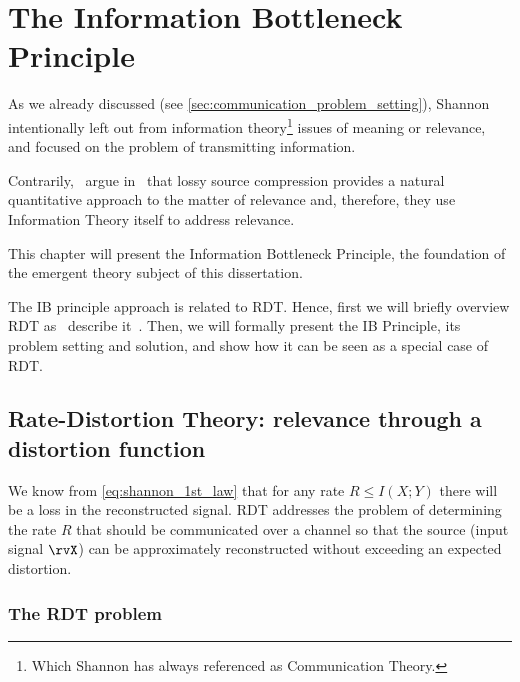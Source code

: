 

\chapter{The Information Bottleneck Principle}\label{ch:ib}


As we already discussed (see \ref{sec:communication_problem_setting}), Shannon intentionally left out from information theory\footnote{Which Shannon has always referenced as Communication Theory.} issues of meaning or relevance, and focused on the problem of transmitting information.

Contrarily,~\citeauthor{tishby:1999} argue in~\cite{tishby:1999} that lossy source compression provides a natural quantitative approach to the matter of relevance and, therefore, they use Information Theory itself to address relevance.

This chapter will present the Information Bottleneck Principle, the foundation of the emergent theory subject of this dissertation.

The IB principle approach is related to \acf*{RDT}. Hence, first we will briefly overview RDT as~\citeauthor{tishby:1999} describe it~\cite{tishby:1999,slonim:2002}. Then, we will formally present the IB Principle, its problem setting and solution, and show how it can be seen as a special case of \acl{RDT}.

\section{Rate-Distortion Theory: relevance through a distortion function}\label{sec:RDT}
We know from \eqref{eq:shannon_1st_law} that for any rate $R \leq I(X;Y)$ there will be a loss in the reconstructed signal. \acf*{RDT} addresses the problem of determining the rate $R$ that should be communicated over a channel so that the source (input signal $\rvX$) can be approximately reconstructed without exceeding an expected distortion.

\subsection{The \ac{RDT} problem}

